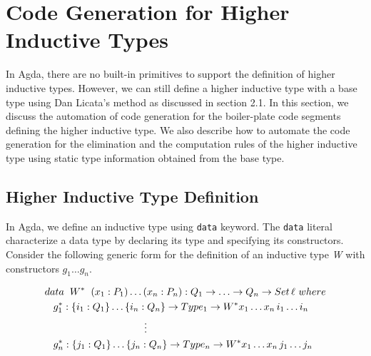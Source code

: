 \documentclass[sigplan,10pt]{acmart}
\begin{document}
\section{Code Generation for Higher Inductive Types}
\label{sec:sec4}

In Agda, there are no built-in primitives to support the definition of higher inductive types. However, we can still define a higher inductive type with a base type using Dan Licata's \citep{Licata-2011} method as discussed in section 2.1. In this section, we discuss the automation of code generation for the boiler-plate code segments defining the higher inductive type. We also describe how to automate the code generation for the elimination and the computation rules of the higher inductive type using static type information obtained from the base type.


\subsection{Higher Inductive Type Definition}
\label{sec:sec4.1}

In Agda, we define an inductive type using {\tt data} keyword. The {\tt data} literal characterize a data type by declaring its type and specifying its constructors. Consider the following generic form for the definition of an inductive type \emph{W} with constructors $g_1 \ldots g_n$.
\begin{center}
\begingroup
\fontsize{7.9pt}{0pt}\selectfont
\begin{align}
& data \hspace{0.2cm} W^* \hspace{0.2cm} (x_1:P_1)\ldots(x_n:P_n) : Q_1 \rightarrow\ldots\rightarrow Q_n \rightarrow Set \, \ell \, \, where \nonumber \\
& \hspace{0.3cm} g_1^* : \{i_1 : Q_1\} \ldots \{i_n : Q_n\} \rightarrow Type_1\rightarrow W^* x_1 \ldots x_n \, i_1 \ldots i_n \nonumber \\
& \hspace{3.5cm} \vdots \nonumber \\
& \hspace{0.3cm} g_n^* : \{j_1 : Q_1\} \ldots \{j_n : Q_n\} \rightarrow Type_n\rightarrow W^* x_1 \dots x_n \, j_1 \ldots j_n \nonumber \\ \nonumber
\end{align}
\endgroup
\end{center}
\normalsize
\end{document}
